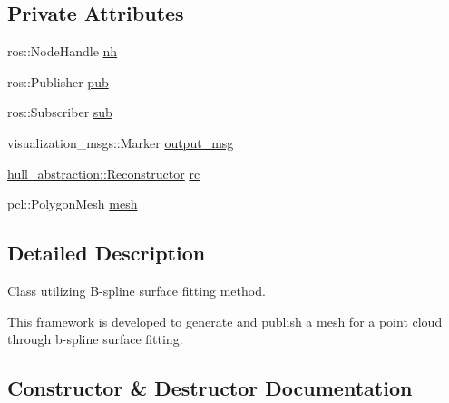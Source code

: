 \subsection*{Private Attributes}
\begin{DoxyCompactItemize}
\item 
ros\+::\+Node\+Handle \hyperlink{classbspline__surface__fitting__node_1_1_bspline_surface_fitting_ab3fb2f277d26f9a58e9575257d035251}{nh}
\item 
ros\+::\+Publisher \hyperlink{classbspline__surface__fitting__node_1_1_bspline_surface_fitting_ac1a664418699fc1f06e5da7637530520}{pub}
\item 
ros\+::\+Subscriber \hyperlink{classbspline__surface__fitting__node_1_1_bspline_surface_fitting_a1ca9460f2069655ce0b55683a6622688}{sub}
\item 
visualization\+\_\+msgs\+::\+Marker \hyperlink{classbspline__surface__fitting__node_1_1_bspline_surface_fitting_af6d288e4349188b2a8dc4cae61bc1971}{output\+\_\+msg}
\item 
\hyperlink{classhull__abstraction_1_1_reconstructor}{hull\+\_\+abstraction\+::\+Reconstructor} \hyperlink{classbspline__surface__fitting__node_1_1_bspline_surface_fitting_a37fc14202f71f41647bc78ed21a1f691}{rc}
\item 
pcl\+::\+Polygon\+Mesh \hyperlink{classbspline__surface__fitting__node_1_1_bspline_surface_fitting_a3f3f3a25956432185b5927e0b920a53e}{mesh}
\end{DoxyCompactItemize}


\subsection{Detailed Description}
Class utilizing B-\/spline surface fitting method. 

This framework is developed to generate and publish a mesh for a point cloud through b-\/spline surface fitting. 

\subsection{Constructor \& Destructor Documentation}
